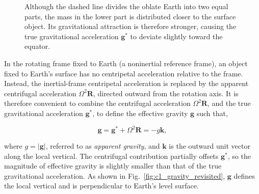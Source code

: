 \documentclass[10pt,twocolumn]{memoir}
\begin{document}
\begin{figure}[t]
\centering
{}

\caption{Although the dashed line divides the oblate Earth into two equal parts, the mass in the lower part is distributed closer to the surface object. Its gravitational attraction is therefore stronger, causing the true gravitational acceleration $\mathbf{g}^*$ to deviate slightly toward the equator.}

\label{fig:c1_nonuniform_mass_distribution}
\end{figure}

In the rotating frame fixed to Earth (a noninertial reference frame), an object fixed to Earth's surface has no centripetal acceleration relative to the frame. Instead, the inertial-frame centripetal acceleration is replaced by the apparent centrifugal acceleration $\Omega^2\mathbf{R}$, directed outward from the rotation axis. It is therefore convenient to combine the centrifugal acceleration $\Omega^2\mathbf{R}$, and the true gravitational acceleration $\mathbf{g}^*$, to define the effective gravity $\mathbf{g}$ such that,

\begin{equation}
    \mathbf{g} = \mathbf{g}^* + \Omega^2\mathbf{R} = -g\mathbf{k},
\end{equation}

where $g=|\mathbf{g}|$, referred to as \textit{apparent gravity}, and $\mathbf{k}$ is the outward unit vector along the local vertical. The centrifugal contribution partially offsets $\mathbf{g}^*$, so the magnitude of effective gravity is slightly smaller than that of the true gravitational acceleration. As shown in Fig.~\ref{fig:c1_gravity_revisited}, $\mathbf{g}$ defines the local vertical and is perpendicular to Earth's level surface.
\end{document}
